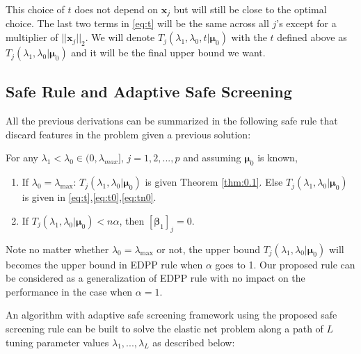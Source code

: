 This choice of $t$ does not depend on $\boldsymbol x_j$ but will still be close to the optimal choice. The last two terms in \eqref{eq:t} will be the same across all $j$'s except for a multiplier of $||\boldsymbol x_j||_2$. We will denote $T_j(\lambda_1,\lambda_0,t|\boldsymbol\mu_0)$ with the $t$ defined above as $T_j(\lambda_1,\lambda_0|\boldsymbol\mu_0)$ and it will be the final upper bound we want.

\subsection{Safe Rule and Adaptive Safe Screening}

All the previous derivations can be summarized in the following safe rule that discard features in the problem given a previous solution:

\begin{theorem}
    \label{thm:rule}
    For any $\lambda_1<\lambda_{0}\in (0,\lambda_{max}]$, $j=1,2,...,p$ and assuming $\boldsymbol\mu_0$ is known,
    \begin{enumerate}
        \item If $\lambda_0=\lambda_{\max}$: $T_j(\lambda_1,\lambda_0|\boldsymbol\mu_0)$ is given Theorem \ref{thm:0.1}. Else $T_j(\lambda_1,\lambda_0|\boldsymbol\mu_0)$ is given in \eqref{eq:t},\eqref{eq:t0},\eqref{eq:tn0}.
        \item If $T_j(\lambda_1,\lambda_0|\boldsymbol\mu_0)<n\alpha$, then $[\boldsymbol\beta_{1}]_j=0$.
    \end{enumerate}
\end{theorem}

Note no matter whether $\lambda_0=\lambda_{\max}$ or not, the upper bound $T_j(\lambda_1,\lambda_0|\boldsymbol\mu_0)$ will becomes the upper bound in EDPP rule when $\alpha$ goes to 1. Our proposed rule can be considered as a generalization of EDPP rule with no impact on the performance in the case when $\alpha=1$.

An algorithm with adaptive safe screening framework \citep{wang2021adaptive} using the proposed safe screening rule can be built to solve the elastic net problem along a path of $L$ tuning parameter values $\lambda_1,...,\lambda_L$ as described below:

